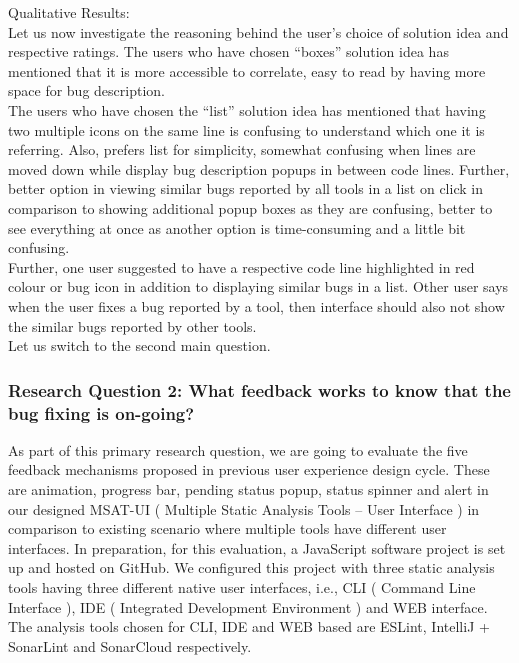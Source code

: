 Qualitative Results: \\

Let us now investigate the reasoning behind the user’s choice of solution idea and respective ratings. The users who have chosen “boxes” solution idea has mentioned that it is more accessible to correlate, easy to read by having more space for bug description. \\

The users who have chosen the “list” solution idea has mentioned that having two multiple icons on the same line is confusing to understand which one it is referring. Also, prefers list for simplicity, somewhat confusing when lines are moved down while display bug description popups in between code lines. Further,  better option in viewing similar bugs reported by all tools in a list on click in comparison to showing additional popup boxes as they are confusing, better to see everything at once as another option is time-consuming and a little bit confusing. \\

Further, one user suggested to have a respective code line highlighted in red colour or bug icon in addition to displaying similar bugs in a list. Other user says when the user fixes a bug reported by a tool, then interface should also not show the similar bugs reported by other tools. \\

Let us switch to the second main question.

\subsubsection{Research Question 2: What feedback works to know that the bug fixing is on-going?}

As part of this primary research question, we are going to evaluate the five feedback mechanisms proposed in previous user experience design cycle. These are animation, progress bar, pending status popup, status spinner and alert in our designed MSAT-UI ( Multiple Static Analysis Tools – User Interface ) in comparison to existing scenario where multiple tools have different user interfaces. In preparation, for this evaluation, a JavaScript software project is set up and hosted on GitHub. We configured this project with three static analysis tools having three different native user interfaces, i.e., CLI ( Command Line Interface ), IDE ( Integrated Development Environment ) and WEB interface. The analysis tools chosen for CLI, IDE and WEB based are ESLint, IntelliJ + SonarLint and SonarCloud respectively. \\

